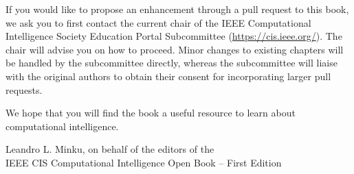 If you would like to propose an enhancement through a pull request to this book, we ask you to first contact the current chair of the IEEE Computational Intelligence Society Education Portal Subcommittee (\url{https://cis.ieee.org/}). The chair will advise you on how to proceed. Minor changes to existing chapters will be handled by the subcommittee directly, whereas the subcommittee will liaise with the original authors to obtain their consent for incorporating larger pull requests. 

We hope that you will find the book a useful resource to learn about computational intelligence.

\vspace{\baselineskip}
\begin{flushright}\noindent
Leandro L. Minku, on behalf of the editors of the\\
IEEE CIS Computational Intelligence Open Book -- First Edition 
\end{flushright}


